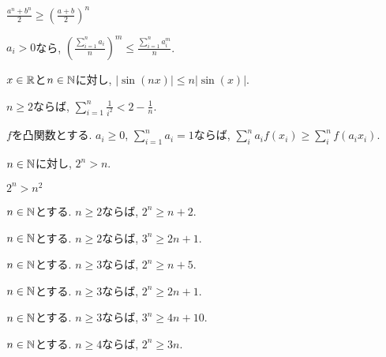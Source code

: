 \begin{prop}
$\frac{a^n+b^n}{2}\geq \left(\frac{a+b}{2}\right)^n$
\end{prop}

\begin{prop}
  $a_i>0$なら,
  $\left(\frac{\sum_{i=1}^n a_i}{n}\right)^m \leq \frac{\sum_{i=1}^{n}a_i^m}{n}$.
\end{prop}

\begin{prop}
$x\in\mathbb{R}$と$n\in\mathbb{N}$に対し, $|\sin(nx)|\leq n|\sin(x)|$.
\end{prop}

\begin{prop}
  $n\geq 2$ならば,
  $\sum_{i=1}^{n}\frac{1}{i^2}<2-\frac{1}{n}$.
\end{prop}

\begin{prop}
  $f$を凸関数とする.
  $a_i\geq 0$, $\sum_{i=1}^n a_i=1$ならば,
  $\sum_{i}^{n} a_i f(x_i)\geq \sum_{i}^{n}  f(a_i x_i)$.
\end{prop}


\begin{prop}
$n\in\mathbb{N}$に対し, $2^n> n$.
\end{prop}

\begin{prop}
  $2^n>n^2$
\end{prop}

\begin{prop}
$n\in\mathbb{N}$とする.
  $n\geq 2$ならば, $2^n \geq n+2$.
\end{prop}

\begin{prop}
$n\in\mathbb{N}$とする.
  $n\geq 2$ならば, $3^n \geq 2n+1$.
\end{prop}


\begin{prop}
$n\in\mathbb{N}$とする.
  $n\geq 3$ならば, $2^n\geq n+5$.
\end{prop}

\begin{prop}
$n\in\mathbb{N}$とする.
  $n\geq 3$ならば, $2^n\geq 2n+1$.
\end{prop}

\begin{prop}
$n\in\mathbb{N}$とする.
  $n\geq 3$ならば, $3^n\geq 4n+10$.
\end{prop}

\begin{prop}
$n\in\mathbb{N}$とする.
  $n\geq 4$ならば, $2^n\geq 3n$.
\end{prop}



